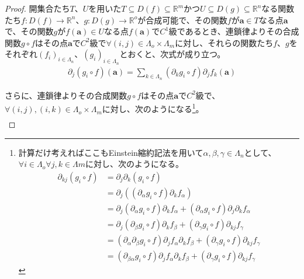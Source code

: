 \documentclass[dvipdfmx]{jsarticle}
\begin{document}
\begin{proof}
開集合たち$T$、$U$を用いた$T \subseteq D(f) \subseteq \mathbb{R}^{m}$かつ$U \subseteq D(g) \subseteq \mathbb{R}^{n}$なる関数たち$f:D(f) \rightarrow \mathbb{R}^{n}$、$g:D(g) \rightarrow \mathbb{R}^{o}$が合成可能で、その関数$f$が$\mathbf{a} \in T$なる点$\mathbf{a}$で、その関数$g$が$f\left( \mathbf{a} \right) \in U$なる点$f\left( \mathbf{a} \right)$で$C^{1}$級であるとき、連鎖律よりその合成関数$g \circ f$はその点$\mathbf{a}$で$C^{2}$級で$\forall(i,j) \in \varLambda_{o} \times \varLambda_{m}$に対し、それらの関数たち$f$、$g$をそれぞれ$\left( f_{i} \right)_{i \in \varLambda_{n}}$、$\left( g_{i} \right)_{i \in \varLambda_{n}}$とおくと、次式が成り立つ。
\begin{align*}
\partial_{j}\left( g_{i} \circ f \right)\left( \mathbf{a} \right) = \sum_{k \in \varLambda_{n}} {\left( \partial_{k}g_{i} \circ f \right)\partial_{j}f_{k}}\left( \mathbf{a} \right)
\end{align*}\par
さらに、連鎖律よりその合成関数$g \circ f$はその点$\mathbf{a}$で$C^{2}$級で、$\forall(i,j),(i,k) \in \varLambda_{o} \times \varLambda_{m}$に対し、次のようになる\footnote{計算だけ考えればここもEinstein縮約記法を用いて$\alpha ,\beta ,\gamma \in \varLambda_{n}$として、$\forall i\in \varLambda_{o} \forall j,k\in \varLambda{m} $に対し、次のようになる。
\begin{align*}
\partial_{kj}\left( g_i \circ f \right) &= \partial_j \partial_k \left( g_i \circ f\right) \\
&=\partial_j \left( \left( \partial_{\alpha} g_i \circ f\right) \partial_k f_{\alpha} \right) \\
&=\partial_j \left( \partial_{\alpha} g_i \circ f\right) \partial_k f_{\alpha} +\left( \partial_{\alpha}  g_i \circ f\right) \partial_j \partial_k f_{\alpha} \\
&=\partial_j \left( \partial_{\beta} g_i \circ f\right) \partial_k f_{\beta} +\left( \partial_{\gamma}  g_i \circ f\right) \partial_{kj} f_{\gamma} \\
&=\left( \partial_{\alpha} \partial_{\beta} g_i \circ f\right) \partial_j f_{\alpha} \partial_k f_{\beta} +\left( \partial_{\gamma}  g_i \circ f\right) \partial_{kj} f_{\gamma} \\
&=\left( \partial_{\beta \alpha} g_i \circ f\right) \partial_j f_{\alpha} \partial_k f_{\beta} +\left( \partial_{\gamma}  g_i \circ f\right) \partial_{kj} f_{\gamma} 
\end{align*}}。
\begin{align*}

\end{align*}
\end{proof}
\end{document}
